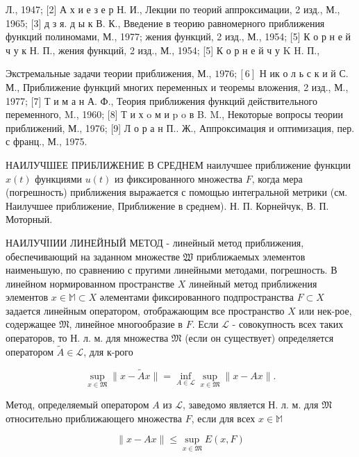 \documentclass[10pt]{article}
\begin{document}
Л., 1947; [2] А х и е з е р Н. И., Лекции по теорий аппроксимации, 2 изд., М., 1965; [3] д з я. д ы к В. К., Введение в теорию равномерного приближения функций полиномами, М., 1977; жения функций, 2 изд., М., 1954; [5] К о р н е й ч у к Н. П., жения функций, 2 изд., М., 1954; [5] К о р н е й ч у K H. П.,

Экстремальные задачи теории приближения, М., $1976 ;[6]$ Н ик о л ь с к и й С. М., Приближение функций многих переменных и теоремы вложения, 2 изд., М., 1977; [7] Т и м а н А. Ф., Теория приближения функций действительного переменного, M., 1960; [8] Т и х o м и p o в B. M., Некоторые вопросы теории приближений, М., 1976; [9] Л о р а н П.. Ж., Аппроксимация и оптимизация, пер. с франц., М., 1975.



НАИЛУЧШЕЕ ПРИБЛИЖЕНИЕ В СРЕДНЕМ наилучшее приближение функции $x(t)$ функциями $u(t)$ из фиксированного множества $F$, когда мера (погрешность) приближения выражается с помощью интегральной метрики (см. Наилучшее приближение, Приближение в среднем). Н. П. Корнейчук, В. П. Моторный.



НАИЛУЧІІИИ ЛИНЕЙНЫЙ МЕТОД - линейный метод приближения, обеспечивающий на заданном множестве $\mathfrak{W}$ приближаемых элементов наименьшую, по сравнению с пругими линейными методами, погрешность. В линейном нормированном пространстве $X$ линейный метод приближения элементов $x \in \mathbb{M} \subset X$ әлементами фиксированного подпространства $F \subset X$ задается линейным оператором, отображающим все пространство $X$ или нек-рое, содержащее $\mathfrak{M}$, линейное многообразие в $F$. Если $\mathscr{L}$ - совокупность всех таких операторов, то Н. л. м. для множества $\mathfrak{M}$ (если он существует) определяется оператором $\tilde{A} \in \mathscr{L}$, для к-рого



\[

\sup _{x \in \mathfrak{M}}\|x-\tilde{A} x\|=\inf _{A \in \mathscr{L}} \sup _{x \in \mathfrak{M}}\|x-A x\| .

\]



Метод, определяемый оператором $A$ из $\mathscr{L}$, заведомо является Н. л. м. для $\mathfrak{M}$ относительно приближающего множества $F$, если для всех $x \in \mathbb{M}$



\[

\|x-A x\| \leqslant \sup _{x \in \mathfrak{M}} E(x, F)

\]
\end{document}

